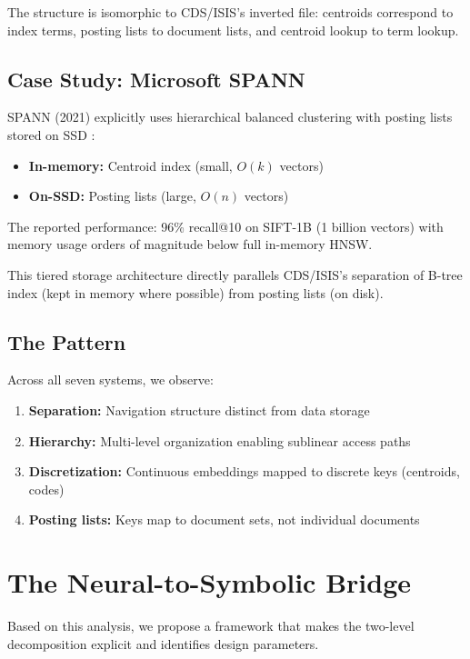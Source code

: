 \documentclass[manuscript,screen,nonacm]{acmart}
\begin{document}
The structure is isomorphic to CDS/ISIS's inverted file: centroids correspond to index terms, posting lists to document lists, and centroid lookup to term lookup.

\subsection{Case Study: Microsoft SPANN}

SPANN (2021) explicitly uses hierarchical balanced clustering with posting lists stored on SSD \cite{chen2021}:
\begin{itemize}
    \item \textbf{In-memory:} Centroid index (small, $O(k)$ vectors)
    \item \textbf{On-SSD:} Posting lists (large, $O(n)$ vectors)
\end{itemize}

The reported performance: 96\% recall@10 on SIFT-1B (1 billion vectors) with memory usage orders of magnitude below full in-memory HNSW.

This tiered storage architecture directly parallels CDS/ISIS's separation of B-tree index (kept in memory where possible) from posting lists (on disk).

\subsection{The Pattern}

Across all seven systems, we observe:
\begin{enumerate}
    \item \textbf{Separation:} Navigation structure distinct from data storage
    \item \textbf{Hierarchy:} Multi-level organization enabling sublinear access paths
    \item \textbf{Discretization:} Continuous embeddings mapped to discrete keys (centroids, codes)
    \item \textbf{Posting lists:} Keys map to document sets, not individual documents
\end{enumerate}

\section{The Neural-to-Symbolic Bridge}

Based on this analysis, we propose a framework that makes the two-level decomposition explicit and identifies design parameters.
\end{document}
